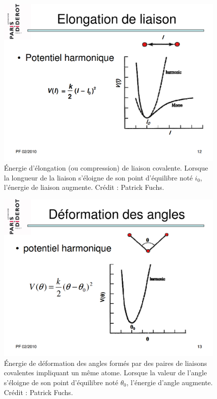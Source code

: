 	\begin{figure}[H]
		\centering
		\includegraphics[width=\textwidth]{figures/ch1/e_bond}
		\caption[Énergie de liaison.]{Énergie d'élongation (ou compression) de liaison covalente. Lorsque la longueur de la liaison s'éloigne de son point d'équilibre noté $i_{0}$, l'énergie de liaison augmente. Crédit : Patrick Fuchs\footnotemark.}
		\label{fig:e_bond}
	\end{figure}
	
	\begin{figure}[H]
		\centering
		\includegraphics[width=\textwidth]{figures/ch1/e_angle}
		\caption[Énergie d'angle.]{Énergie de déformation des angles formés par des paires de liaisons covalentes impliquant un même atome. Lorsque la valeur de l'angle s'éloigne de son point d'équilibre noté $\theta_{0}$, l'énergie d'angle augmente. Crédit : Patrick Fuchs\footnotemark.}
		\label{fig:e_angle}
	\end{figure}
	

